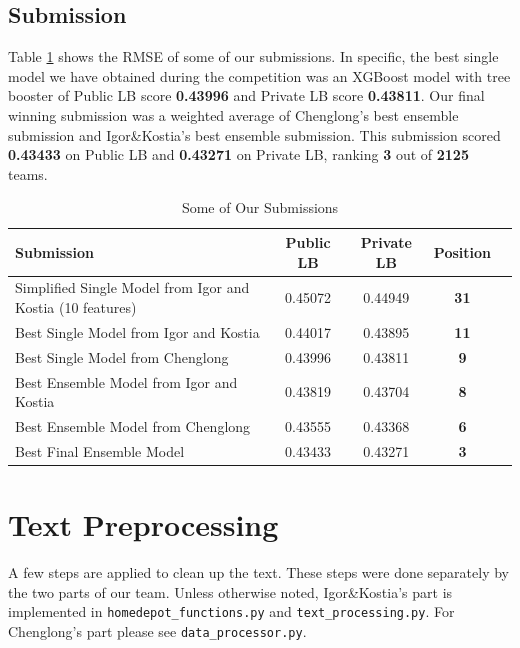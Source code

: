 \documentclass[12pt]{article}
\begin{document}
\subsection{Submission}
\label{subsec:Results_description}
Table \ref{tab:submission} shows the RMSE of some of our submissions. In specific, the best single model we have obtained during the competition was an XGBoost model with tree booster of Public LB score \textbf{0.43996} and Private LB score \textbf{0.43811}. Our final winning submission was a weighted average of Chenglong's best ensemble submission and Igor\&Kostia's best ensemble submission. This submission scored \textbf{0.43433} on Public LB and \textbf{0.43271} on Private LB, ranking \textbf{3} out of \textbf{2125} teams.

\begin{table}[t]
\centering
\caption{Some of Our Submissions}
\label{tab:submission}
\begin{tabular}{|l|c|c|c|c}
\hline
Submission   & Public LB & Private LB & Position\\
\hline\hline
Simplified Single Model from Igor and Kostia (10 features) & 0.45072 & 0.44949 & \textbf{31} \\ \hline
Best Single Model from Igor and Kostia & 0.44017 & 0.43895 & \textbf{11} \\ \hline
Best Single Model from Chenglong & 0.43996 & 0.43811 & \textbf{9}\\ \hline
Best Ensemble Model from Igor and Kostia & 0.43819 & 0.43704 & \textbf{8}\\ \hline
Best Ensemble Model from Chenglong &0.43555 & 0.43368 & \textbf{6}\\ \hline
Best Final Ensemble Model & 0.43433	& 0.43271	& \textbf{3}\\ \hline
\end{tabular}
\end{table}



\section{Text Preprocessing}
A few steps are applied to clean up the text. These steps were done separately by the two parts of our team. Unless otherwise noted, Igor\&Kostia's part is implemented in \texttt{homedepot\_functions.py} and  \texttt{text\_processing.py}. For Chenglong's part please see \texttt{data\_processor.py}.
\end{document}
